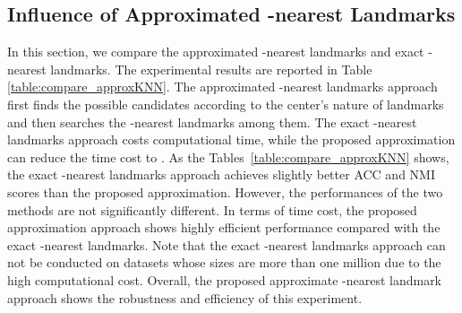 \subsection{Influence of Approximated -nearest Landmarks}
\label{sec:cmpApproxKNN}

In this section, we compare the approximated -nearest landmarks and exact -nearest landmarks.
The experimental results are reported in Table \ref{table:compare_approxKNN}.
The approximated -nearest landmarks approach first finds the possible candidates according to the center's nature of landmarks and then searches the -nearest landmarks among them.
The exact -nearest landmarks approach costs  computational time, while the proposed approximation can reduce the time cost to .
As the Tables~\ref{table:compare_approxKNN} shows, the exact -nearest landmarks approach achieves slightly better ACC and NMI scores than the proposed approximation.
However, the performances of the two methods are not significantly different.
In terms of time cost, the proposed approximation approach shows highly efficient performance compared with the exact -nearest landmarks.
Note that the exact -nearest landmarks approach can not be conducted on datasets whose sizes are more than one million due to the high computational cost.
Overall, the proposed approximate -nearest landmark approach shows the robustness and efficiency of this experiment.

